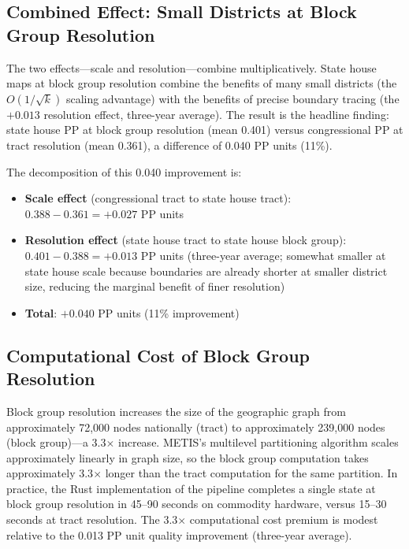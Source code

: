 \subsection{Combined Effect: Small Districts at Block Group Resolution}

The two effects---scale and resolution---combine multiplicatively. State house maps at block group resolution combine the benefits of many small districts (the $O(1/\sqrt{k})$ scaling advantage) with the benefits of precise boundary tracing (the $+0.013$ resolution effect, three-year average). The result is the headline finding: state house PP at block group resolution (mean 0.401) versus congressional PP at tract resolution (mean 0.361), a difference of 0.040 PP units (11\%).

The decomposition of this 0.040 improvement is:
\begin{itemize}
\item \textbf{Scale effect} (congressional tract to state house tract): $0.388 - 0.361 = +0.027$ PP units
\item \textbf{Resolution effect} (state house tract to state house block group): $0.401 - 0.388 = +0.013$ PP units (three-year average; somewhat smaller at state house scale because boundaries are already shorter at smaller district size, reducing the marginal benefit of finer resolution)
\item \textbf{Total}: $+0.040$ PP units (11\% improvement)
\end{itemize}

\subsection{Computational Cost of Block Group Resolution}

Block group resolution increases the size of the geographic graph from approximately 72,000 nodes nationally (tract) to approximately 239,000 nodes (block group)---a 3.3$\times$ increase. METIS's multilevel partitioning algorithm scales approximately linearly in graph size, so the block group computation takes approximately 3.3$\times$ longer than the tract computation for the same partition. In practice, the Rust implementation of the pipeline completes a single state at block group resolution in 45--90 seconds on commodity hardware, versus 15--30 seconds at tract resolution. The 3.3$\times$ computational cost premium is modest relative to the 0.013 PP unit quality improvement (three-year average).
